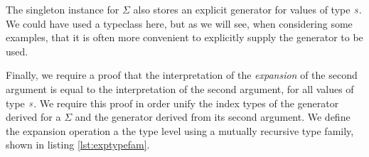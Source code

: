 \documentclass[a4paper,msc,twosized=semi]{uustthesis}
\let\oldemph\emph
\renewcommand\emph[1]{{\large\oldemph{#1}}}
\newcommand*{\mathcolor}{}
\def\mathcolor#1#{\mathcoloraux{#1}}
\newcommand*{\mathcoloraux}[3]{%
  \protect\leavevmode
  \begingroup
    \color#1{#2}#3%
  \endgroup
}
\newcommand{\HSVar}[1]{\mathcolor{hsblue5}{\mathit{#1}}}
\begin{document}
  The singleton instance for \ensuremath{\Sigma } also stores an explicit generator for values of 
  type \ensuremath{\HSVar{s}}. We could have used a typeclass here, but as we will see, when considering 
  some examples, that it is often more convenient to explicitly supply the generator 
  to be used. 
  
  Finally, we require a proof that the interpretation of the \emph{expansion} of the 
  second argument is equal to the interpretation of the second argument, for all 
  values of type \ensuremath{\HSVar{s}}. We require this proof in order unify the index types of the 
  generator derived for a \ensuremath{\Sigma } and the generator derived from its second argument. 
  We define the expansion operation a the type level using a mutually recursive type 
  family, shown in listing \ref{lst:exptypefam}. 
\end{document}
